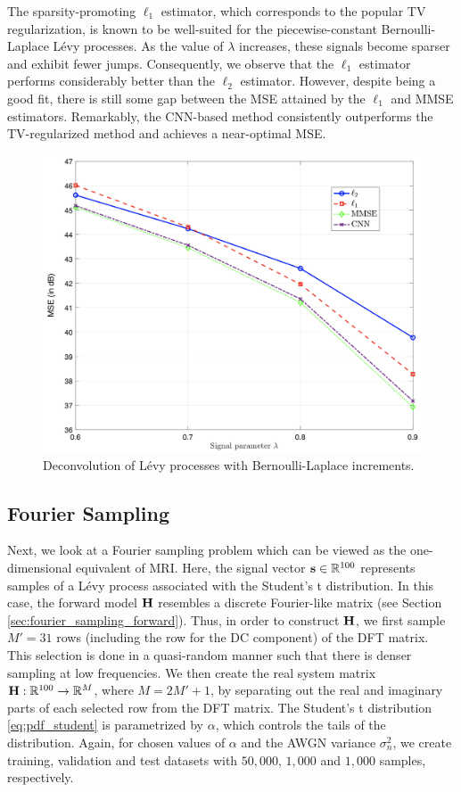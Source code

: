 \documentclass[journal]{IEEEtran}
\begin{document}
The sparsity-promoting $\ell_1$ estimator, which corresponds to the popular TV regularization, is known to be well-suited for the piecewise-constant Bernoulli-Laplace L\'{e}vy processes. As the value of $\lambda$ increases, these signals become sparser and exhibit fewer jumps. Consequently, we observe that the $\ell_1$ estimator performs considerably better than the $\ell_2$ estimator. However, despite being a good fit, there is still some gap between the MSE attained by the $\ell_1$ and MMSE estimators. Remarkably, the CNN-based method consistently outperforms the TV-regularized method and achieves a near-optimal MSE.



\begin{figure}[t]
    \centering
    \includegraphics[width=\linewidth]{figures/deconvolution_bl}
    \caption{Deconvolution of L\'{e}vy processes with Bernoulli-Laplace increments.}
    \label{fig:deconvolution_bl}
\end{figure}


\subsection{Fourier Sampling}
Next, we look at a Fourier sampling problem which can be viewed as the one-dimensional equivalent of MRI. Here, the signal vector ${\bf{s}} \in \mathbb{R}^{100}$ represents samples of a L\'{e}vy process associated with the Student's t distribution. In this case, the forward model ${\bf{H}}$ resembles a discrete Fourier-like matrix (see Section \ref{sec:fourier_sampling_forward}). Thus, in order to construct ${\bf{H}}$, we first sample $M' = 31$ rows (including the row for the DC component) of the DFT matrix. This selection is done in a quasi-random manner such that there is denser sampling at low frequencies. We then create the real system matrix ${\bf{H}}: \mathbb{R}^{100} \rightarrow \mathbb{R}^{M}$, where $M = 2M' + 1$, by separating out the real and imaginary parts of each selected row from the DFT matrix. The Student's t distribution \eqref{eq:pdf_student} is parametrized by $\alpha$, which controls the tails of the distribution. Again, for chosen values of $\alpha$ and the AWGN variance $\sigma_n^{2}$, we create training, validation and test datasets with $50,000$, $1,000$ and $1,000$ samples, respectively.
\end{document}

